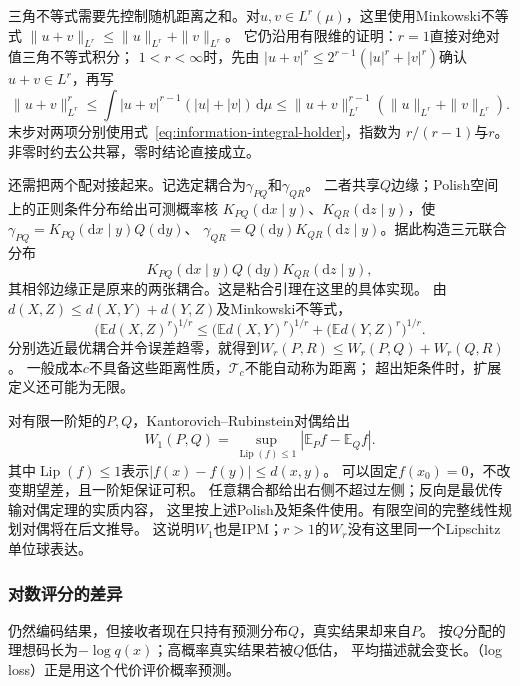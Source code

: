 三角不等式需要先控制随机距离之和。对\(u,v\in L^r(\mu)\)，这里使用Minkowski不等式
\(\|u+v\|_{L^r}\leq\|u\|_{L^r}+\|v\|_{L^r}\)。
它仍沿用有限维的证明：\(r=1\)直接对绝对值三角不等式积分；
\(1<r<\infty\)时，先由
\(|u+v|^r\leq2^{r-1}(|u|^r+|v|^r)\)确认\(u+v\in L^r\)，再写
\[
 \|u+v\|_{L^r}^r
 \leq\int|u+v|^{r-1}(|u|+|v|)\,\mathrm d\mu
 \leq\|u+v\|_{L^r}^{r-1}(\|u\|_{L^r}+\|v\|_{L^r}).
\]
末步对两项分别使用式~\eqref{eq:information-integral-holder}，指数为
\(r/(r-1)\)与\(r\)。非零时约去公共幂，零时结论直接成立。

还需把两个配对接起来。记选定耦合为\(\gamma_{PQ}\)和\(\gamma_{QR}\)。
二者共享\(Q\)边缘；Polish空间上的正则条件分布给出可测概率核
\(K_{PQ}(\mathrm dx\mid y)\)、\(K_{QR}(\mathrm dz\mid y)\)，使
\(\gamma_{PQ}=K_{PQ}(\mathrm dx\mid y)Q(\mathrm dy)\)、
\(\gamma_{QR}=Q(\mathrm dy)K_{QR}(\mathrm dz\mid y)\)。据此构造三元联合分布
\[
  K_{PQ}(\mathrm dx\mid y)Q(\mathrm dy)K_{QR}(\mathrm dz\mid y),
\]
其相邻边缘正是原来的两张耦合。这是粘合引理在这里的具体实现。
由\(d(X,Z)\leq d(X,Y)+d(Y,Z)\)及Minkowski不等式，
\[
  \bigl(\mathbb E d(X,Z)^r\bigr)^{1/r}
  \leq\bigl(\mathbb E d(X,Y)^r\bigr)^{1/r}
       +\bigl(\mathbb E d(Y,Z)^r\bigr)^{1/r}.
\]
分别选近最优耦合并令误差趋零，就得到\(W_r(P,R)\leq W_r(P,Q)+W_r(Q,R)\)。
一般成本\(c\)不具备这些距离性质，\(\mathcal T_c\)不能自动称为距离；
超出矩条件时，扩展定义还可能为无限。

对有限一阶矩的\(P,Q\)，Kantorovich--Rubinstein对偶给出
\begin{equation}
  W_1(P,Q)=\sup_{\operatorname{Lip}(f)\leq1}
                         |\mathbb E_Pf-\mathbb E_Qf|.
  \label{eq:information-kr-duality}
\end{equation}
其中\(\operatorname{Lip}(f)\leq1\)表示\(|f(x)-f(y)|\leq d(x,y)\)。
可以固定\(f(x_0)=0\)，不改变期望差，且一阶矩保证可积。
任意耦合都给出右侧不超过左侧；反向是最优传输对偶定理的实质内容，
这里按上述Polish及矩条件使用。有限空间的完整线性规划对偶将在后文推导。
这说明\(W_1\)也是IPM；\(r>1\)的\(W_r\)没有这里同一个Lipschitz单位球表达。

\subsubsection{对数评分的差异}
\label{sec:information-log-score-kl}

仍然编码结果，但接收者现在只持有预测分布\(Q\)，真实结果却来自\(P\)。
按\(Q\)分配的理想码长为\(-\log q(x)\)；高概率真实结果若被\(Q\)低估，
平均描述就会变长。（log loss）正是用这个代价评价概率预测。

